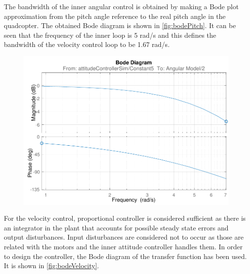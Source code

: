 The bandwidth of the inner angular control is obtained by making a Bode plot approximation from the pitch angle reference to the real pitch angle in the quadcopter. The obtained Bode diagram is shown in \autoref{fig:bodePitch}. It can be seen that the frequency of the inner loop is 5 rad/s and this defines the bandwidth of the velocity control loop to be 1.67 rad/s.
%
\begin{figure}[H]
    \includegraphics[scale=.7]{figures/bodePitch}
    \centering			
    \label{fig:bodePitch}
\end{figure} 
%
%
%
For the velocity control, proportional controller is considered sufficient as there is an integrator in the plant that accounts for possible steady state errors and output disturbances. Input disturbances are considered not to occur as those are related with the motors and the inner attitude controller handles them. In order to design the controller, the Bode diagram of the transfer function has been used. It is shown in \autoref{fig:bodeVelocity}.
